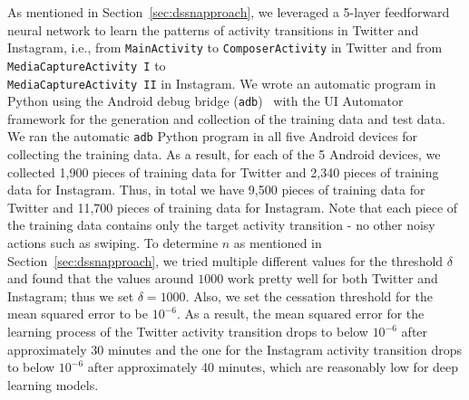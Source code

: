 \documentclass[letterpaper,12pt]{article}
\begin{document}
As mentioned in Section~\ref{sec:dssnapproach}, we leveraged a 5-layer feedforward neural network to learn the patterns of activity transitions in Twitter and Instagram, i.e., from \texttt{MainActivity} to \texttt{ComposerActivity} in Twitter and from \texttt{MediaCaptureActivity I} to \\
\texttt{MediaCaptureActivity II} in Instagram. We wrote an automatic program in Python using the Android debug bridge (\texttt{adb})~\cite{adb} with the UI Automator framework for the generation and collection of the training data and test data. We ran the automatic \texttt{adb} Python program in all five Android devices for collecting the training data. As a result, for each of the 5 Android devices, we collected 1,900 pieces of training data for Twitter and 2,340 pieces of training data for Instagram. Thus, in total we have 9,500 pieces of training data for Twitter and 11,700 pieces of training data for Instagram. Note that each piece of the training data contains only the target activity transition - no other noisy actions such as swiping. To determine $n$ as mentioned in Section~\ref{sec:dssnapproach}, we tried multiple different values for the threshold $\delta$ and found that the values around $1000$ work pretty well for both Twitter and Instagram; thus we set $\delta=1000$. Also, we set the cessation threshold for the mean squared error to be $10^{-6}$. As a result, the mean squared error for the learning process of the Twitter activity transition drops to below $10^{-6}$ after approximately 30 minutes and the one for the Instagram activity transition drops to below $10^{-6}$ after approximately 40 minutes, which are reasonably low for deep learning models.
\end{document}
